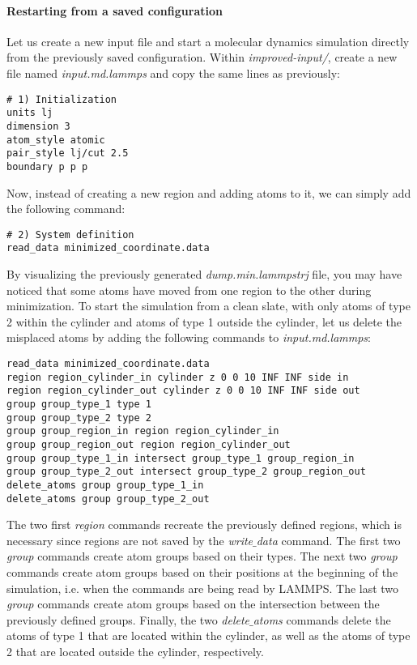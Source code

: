 \paragraph{Restarting from a saved configuration}
Let us create a new input file and start a molecular dynamics simulation directly from the previously saved configuration. Within \textit{improved-input/}, create a new file named \textit{input.md.lammps} and copy the same lines as previously:
\begin{verbatim}
# 1) Initialization
units lj
dimension 3
atom_style atomic
pair_style lj/cut 2.5
boundary p p p
\end{verbatim}
Now, instead of creating a new region and adding atoms to it, we can simply add the following command:
\begin{verbatim}
# 2) System definition
read_data minimized_coordinate.data
\end{verbatim}
By visualizing the previously generated \textit{dump.min.lammpstrj} file, you may have noticed that some atoms have moved from one region to the other during minimization. To start the simulation from a clean slate, with only atoms of type 2 within the cylinder and atoms of type
1 outside the cylinder, let us delete the misplaced atoms by adding the following commands to \textit{input.md.lammps}:
\begin{verbatim}
read_data minimized_coordinate.data
region region_cylinder_in cylinder z 0 0 10 INF INF side in
region region_cylinder_out cylinder z 0 0 10 INF INF side out
group group_type_1 type 1
group group_type_2 type 2
group group_region_in region region_cylinder_in
group group_region_out region region_cylinder_out
group group_type_1_in intersect group_type_1 group_region_in
group group_type_2_out intersect group_type_2 group_region_out
delete_atoms group group_type_1_in
delete_atoms group group_type_2_out
\end{verbatim}
The two first \textit{region} commands recreate the previously defined regions, which is necessary since regions are not saved by the \textit{write$\_$data} command. The first two \textit{group} commands create atom groups based on their types. The next two \textit{group} commands create atom groups based on their
positions at the beginning of the simulation, i.e. when the commands are being read by LAMMPS. The last two \textit{group} commands create atom groups based on the intersection between the previously defined groups. Finally, the two \textit{delete$\_$atoms} commands delete the atoms of type 1 that are located within the cylinder, as well as the atoms of type 2 that are located outside the cylinder, respectively. 

